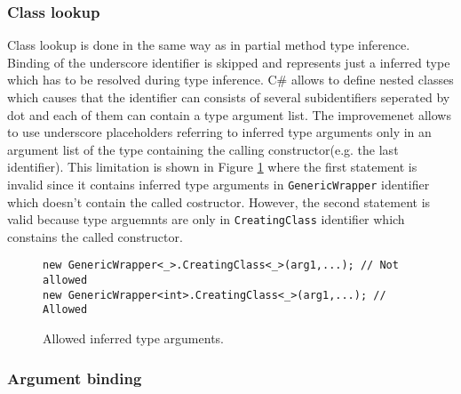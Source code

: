 \subsubsection*{Class lookup}

Class lookup is done in the same way as in partial method type inference.
Binding of the underscore identifier is skipped and represents just a inferred type which has to be resolved during type inference.
C\# allows to define nested classes which causes that the identifier can consists of several subidentifiers seperated by dot and each of them can contain a type argument list.
The improvemenet allows to use underscore placeholders referring to inferred type arguments only in an argument list of the type containing the calling constructor(e.g. the last identifier).
This limitation is shown in Figure \ref{img59:TypeArgList} where the first statement is invalid since it contains inferred type arguments in \texttt{GenericWrapper} identifier which doesn't contain the called costructor.
However, the second statement is valid because type arguemnts are only in \texttt{CreatingClass} identifier which constains the called constructor.
\begin{figure}[h!]
\begin{lstlisting}[style=csharp, mathescape=true]
new GenericWrapper<_>.CreatingClass<_>(arg1,...); // Not allowed
new GenericWrapper<int>.CreatingClass<_>(arg1,...); // Allowed
\end{lstlisting}
\caption{Allowed inferred type arguments.}
\label{img59:TypeArgList}
\end{figure}

\subsubsection*{Argument binding}

